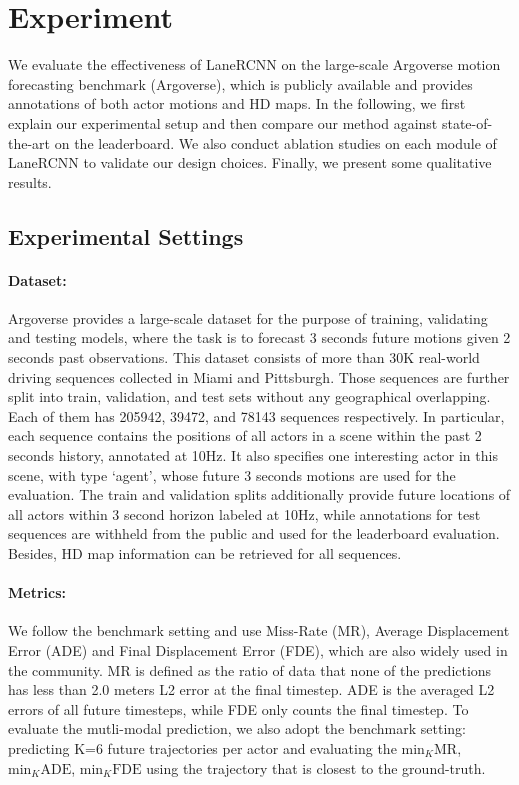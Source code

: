 \section{Experiment}

We evaluate the effectiveness of LaneRCNN on the large-scale Argoverse motion
forecasting benchmark (Argoverse), which is publicly available and provides annotations
of both actor motions and HD maps. In the following, we first
explain our experimental setup and then compare our method against
state-of-the-art on the leaderboard. We also conduct ablation studies on each
module of LaneRCNN to validate our design choices. Finally, we present some
qualitative results.

\subsection{Experimental Settings}
\paragraph{Dataset:}
Argoverse provides a large-scale dataset \cite{argoverse} for the
purpose of training, validating and testing models, where the task is to
forecast 3 seconds future motions given 2 seconds past observations. 
This dataset consists of more than 30K real-world driving sequences collected in Miami and Pittsburgh.
Those sequences are further split into train, validation, and test sets without
any geographical overlapping. Each of them has 205942, 39472, and 78143 sequences
respectively. In particular, each sequence contains the positions of all actors in
a scene within the past 2 seconds history, annotated at 10Hz.
It also specifies one interesting actor in this scene, with type `agent', whose future 3 seconds
motions are used for the evaluation. The train and validation splits additionally
provide future locations of all actors within 3 second horizon labeled at 10Hz, while annotations for test sequences are withheld from the public and used for
the leaderboard evaluation. Besides, HD map information can be retrieved for all
sequences. 

\paragraph{Metrics:} We follow the benchmark setting and use Miss-Rate (MR), Average
Displacement Error (ADE) and Final Displacement Error (FDE), which are also
widely used in the community. MR is defined as the ratio of data that none of
the predictions has less than 2.0 meters L2 error at the final timestep. ADE is
the averaged L2 errors of all future timesteps, while FDE only
counts the final timestep. To evaluate the mutli-modal prediction, we
also adopt the benchmark setting: predicting K=6 future trajectories
per actor and evaluating the $\text{min}_{K}\text{MR}$, $\text{min}_{K}\text{ADE}$,
$\text{min}_{K}\text{FDE}$ using the trajectory that is closest to the
ground-truth.

